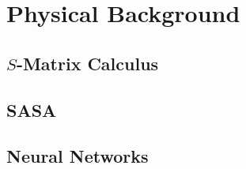 \section{Physical Background}

\subsection{$S$-Matrix Calculus} \label{sec:s_mats}

\clearpage

\subsection{SASA}\label{sec:SASA}



\subsection{Neural Networks} \label{sec:NN_bg}

